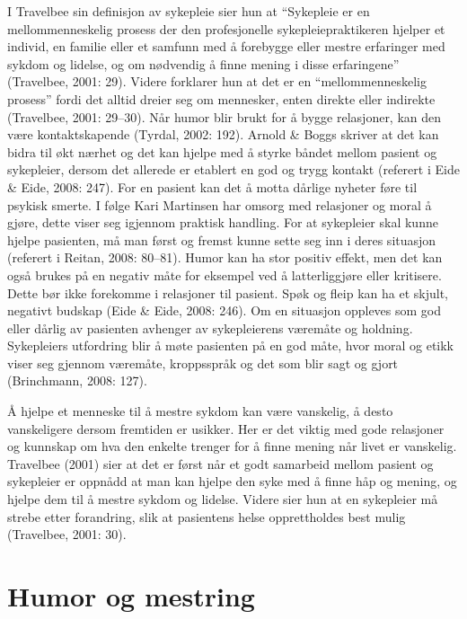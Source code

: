 I Travelbee sin definisjon av sykepleie sier hun at “Sykepleie er en
mellommenneskelig prosess der den profesjonelle sykepleiepraktikeren hjelper et
individ, en familie eller et samfunn med å forebygge eller mestre erfaringer
med sykdom og lidelse, og om nødvendig å finne mening i disse erfaringene”
(Travelbee, 2001: 29). Videre forklarer hun at det er en “mellommenneskelig
prosess” fordi det alltid dreier seg om mennesker, enten direkte eller
indirekte (Travelbee, 2001: 29--30).  Når humor blir brukt for å bygge
relasjoner, kan den være kontaktskapende (Tyrdal, 2002: 192). Arnold \&{} Boggs
skriver at det kan bidra til økt nærhet og det kan hjelpe med å styrke båndet
mellom pasient og sykepleier, dersom det allerede er etablert en god og trygg
kontakt (referert i Eide \&{} Eide, 2008: 247).  For en pasient kan det å motta
dårlige nyheter føre til psykisk smerte. I følge Kari Martinsen har omsorg med
relasjoner og moral å gjøre, dette viser seg igjennom praktisk handling. For at
sykepleier skal kunne hjelpe pasienten, må man  først og fremst kunne sette seg
inn i deres situasjon (referert i Reitan, 2008: 80--81).  Humor kan ha stor
positiv effekt, men det kan også brukes på en negativ måte for eksempel ved å
latterliggjøre eller kritisere. Dette bør ikke forekomme i relasjoner til
pasient. Spøk og fleip kan ha et skjult, negativt budskap (Eide \&{} Eide, 2008:
246). Om en situasjon oppleves som god eller dårlig av pasienten avhenger av
sykepleierens væremåte og holdning. Sykepleiers utfordring blir å møte
pasienten på en god måte, hvor moral og etikk viser seg gjennom væremåte,
kroppsspråk og det som blir sagt og gjort (Brinchmann, 2008: 127).

Å hjelpe et menneske til å mestre sykdom kan være vanskelig, å desto
vanskeligere dersom fremtiden er usikker. Her er det viktig med gode relasjoner
og kunnskap om hva den enkelte trenger for å finne mening når livet er
vanskelig. Travelbee (2001) sier at det er først når et godt samarbeid mellom
pasient og sykepleier er oppnådd at man kan hjelpe den syke med å finne håp og
mening, og hjelpe dem til å mestre sykdom og lidelse. Videre sier hun at en
sykepleier må strebe etter forandring, slik at pasientens helse opprettholdes
best mulig (Travelbee, 2001: 30).

\section{Humor og mestring}

